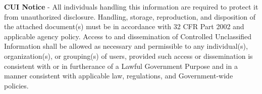 \textbf{CUI Notice} - All individuals handling this information are required to protect
it from unauthorized disclosure. Handling, storage, reproduction, and disposition of the attached document(s) must be in accordance with 32 CFR Part 2002 and applicable agency policy. Access to and dissemination of Controlled Unclassified Information shall be allowed as necessary and permissible to any individual(s), organization(s), or grouping(s) of users, provided such access or dissemination is consistent with or in furtherance of a Lawful Government Purpose and in a manner consistent with applicable law, regulations, and Government-wide policies.